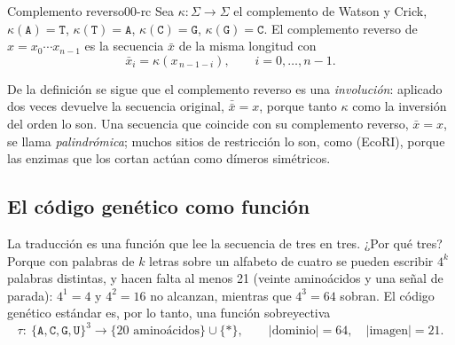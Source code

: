 \begin{definicion}{Complemento reverso}{00-rc}
Sea $\kappa:\Sigma\to\Sigma$ el complemento de Watson y Crick, $\kappa(\texttt{A})=\texttt{T}$, $\kappa(\texttt{T})=\texttt{A}$, $\kappa(\texttt{C})=\texttt{G}$, $\kappa(\texttt{G})=\texttt{C}$. El complemento reverso de $x=x_0\cdots x_{n-1}$ es la secuencia $\bar x$ de la misma longitud con
\begin{equation}\label{eq:00-rc}
\bar x_i = \kappa\!\left(x_{\,n-1-i}\right), \qquad i=0,\ldots,n-1 .
\end{equation}
\end{definicion}

\begin{simbolos}
\end{simbolos}

De la definición se sigue que el complemento reverso es una \emph{involución}: aplicado dos veces devuelve la secuencia original, $\bar{\bar x}=x$, porque tanto $\kappa$ como la inversión del orden lo son. Una secuencia que coincide con su complemento reverso, $\bar x = x$, se llama \emph{palindrómica}; muchos sitios de restricción lo son, como  (EcoRI), porque las enzimas que los cortan actúan como dímeros simétricos.


\subsection{El código genético como función}

La traducción es una función que lee la secuencia de tres en tres. ¿Por qué tres? Porque con palabras de $k$ letras sobre un alfabeto de cuatro se pueden escribir $4^k$ palabras distintas, y hacen falta al menos 21 (veinte aminoácidos y una señal de parada): $4^1=4$ y $4^2=16$ no alcanzan, mientras que $4^3=64$ sobran. El código genético estándar es, por lo tanto, una función sobreyectiva
\begin{equation}\label{eq:00-codigo}
\tau:\ \{\texttt{A},\texttt{C},\texttt{G},\texttt{U}\}^3 \longrightarrow \{\text{20 aminoácidos}\}\cup\{\ast\},\qquad |\text{dominio}|=64,\quad |\text{imagen}|=21 .
\end{equation}

\begin{simbolos}
\end{simbolos}

